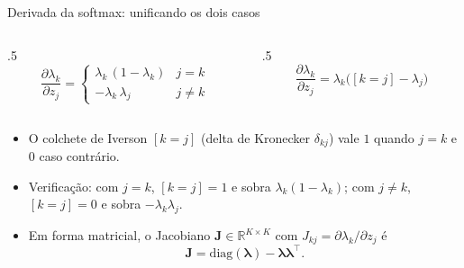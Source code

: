 \documentclass[aspectratio=169,xcolor=dvipsnames]{beamer}
\begin{document}
  \begin{frame}{Derivada da softmax: unificando os dois casos}
    \begin{columns}
      \begin{column}{.5\linewidth}
        \[
          \frac{\partial \lambda_k}{\partial z_j} =
            \begin{cases}
              \lambda_k\,(1-\lambda_k) & j = k \\
              -\lambda_k\,\lambda_j    & j \ne k
            \end{cases}
        \]
      \end{column}
      \begin{column}{.5\linewidth}
        \[
          \boxed{\frac{\partial \lambda_k}{\partial z_j} = \lambda_k\big([k=j] - \lambda_j\big)}
        \]
      \end{column}
    \end{columns}
    \vspace{0.6em}
    \begin{itemize}
      \item O colchete de Iverson $[k=j]$ (delta de Kronecker $\delta_{kj}$) vale $1$ quando
        $j=k$ e $0$ caso contrário.
      \item Verificação: com $j=k$, $[k=j]=1$ e sobra $\lambda_k(1-\lambda_k)$;
        com $j\ne k$, $[k=j]=0$ e sobra $-\lambda_k\lambda_j$.
      \item Em forma matricial, o Jacobiano $\mathbf{J}\in\mathbb{R}^{K\times K}$ com
        $J_{kj} = \partial\lambda_k/\partial z_j$ é
        \[
          \mathbf{J} = \mathrm{diag}(\bm{\lambda}) - \bm{\lambda}\bm{\lambda}^{\top}.
        \]
    \end{itemize}
  \end{frame}
\end{document}
